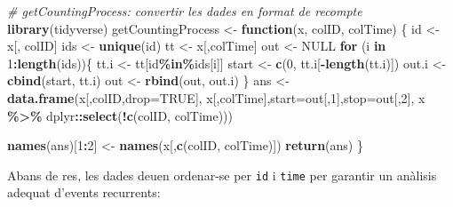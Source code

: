 \documentclass[
]{article}
\newenvironment{Shaded}{\begin{snugshade}}{\end{snugshade}}
\newcommand{\AttributeTok}[1]{\textcolor[rgb]{0.13,0.29,0.53}{#1}}
\newcommand{\CommentTok}[1]{\textcolor[rgb]{0.56,0.35,0.01}{\textit{#1}}}
\newcommand{\ConstantTok}[1]{\textcolor[rgb]{0.56,0.35,0.01}{#1}}
\newcommand{\ControlFlowTok}[1]{\textcolor[rgb]{0.13,0.29,0.53}{\textbf{#1}}}
\newcommand{\DecValTok}[1]{\textcolor[rgb]{0.00,0.00,0.81}{#1}}
\newcommand{\FunctionTok}[1]{\textcolor[rgb]{0.13,0.29,0.53}{\textbf{#1}}}
\newcommand{\NormalTok}[1]{#1}
\newcommand{\OtherTok}[1]{\textcolor[rgb]{0.56,0.35,0.01}{#1}}
\newcommand{\SpecialCharTok}[1]{\textcolor[rgb]{0.81,0.36,0.00}{\textbf{#1}}}
\begin{document}
\begin{Shaded}
\begin{Highlighting}[]
\CommentTok{\# getCountingProcess: convertir les dades en format de recompte}
\FunctionTok{library}\NormalTok{(tidyverse)}
\NormalTok{getCountingProcess }\OtherTok{\textless{}{-}} \ControlFlowTok{function}\NormalTok{(x, colID, colTime) \{}
\NormalTok{  id }\OtherTok{\textless{}{-}}\NormalTok{ x[, colID]}
\NormalTok{  ids }\OtherTok{\textless{}{-}} \FunctionTok{unique}\NormalTok{(id)}
\NormalTok{  tt }\OtherTok{\textless{}{-}}\NormalTok{ x[,colTime]}
\NormalTok{  out }\OtherTok{\textless{}{-}} \ConstantTok{NULL}
  \ControlFlowTok{for}\NormalTok{ (i }\ControlFlowTok{in} \DecValTok{1}\SpecialCharTok{:}\FunctionTok{length}\NormalTok{(ids))\{}
\NormalTok{    tt.i }\OtherTok{\textless{}{-}}\NormalTok{ tt[id}\SpecialCharTok{\%in\%}\NormalTok{ids[i]]}
\NormalTok{    start }\OtherTok{\textless{}{-}} \FunctionTok{c}\NormalTok{(}\DecValTok{0}\NormalTok{, tt.i[}\SpecialCharTok{{-}}\FunctionTok{length}\NormalTok{(tt.i)])}
\NormalTok{    out.i }\OtherTok{\textless{}{-}} \FunctionTok{cbind}\NormalTok{(start, tt.i)}
\NormalTok{    out }\OtherTok{\textless{}{-}} \FunctionTok{rbind}\NormalTok{(out, out.i)}
\NormalTok{  \}}
\NormalTok{  ans }\OtherTok{\textless{}{-}} \FunctionTok{data.frame}\NormalTok{(x[,colID,}\AttributeTok{drop=}\ConstantTok{TRUE}\NormalTok{],}
\NormalTok{                    x[,colTime],}\AttributeTok{start=}\NormalTok{out[,}\DecValTok{1}\NormalTok{],}\AttributeTok{stop=}\NormalTok{out[,}\DecValTok{2}\NormalTok{],}
\NormalTok{                    x }\SpecialCharTok{\%\textgreater{}\%}\NormalTok{ dplyr}\SpecialCharTok{::}\FunctionTok{select}\NormalTok{(}\SpecialCharTok{!}\FunctionTok{c}\NormalTok{(colID, colTime)))}
  
  \FunctionTok{names}\NormalTok{(ans)[}\DecValTok{1}\SpecialCharTok{:}\DecValTok{2}\NormalTok{] }\OtherTok{\textless{}{-}} \FunctionTok{names}\NormalTok{(x[,}\FunctionTok{c}\NormalTok{(colID, colTime)])}
  \FunctionTok{return}\NormalTok{(ans)}
\NormalTok{\}}
\end{Highlighting}
\end{Shaded}

Abans de res, les dades deuen ordenar-se per \texttt{id} i \texttt{time}
per garantir un anàlisis adequat d'events recurrents:

\begin{Shaded}
\end{Shaded}
\end{document}
